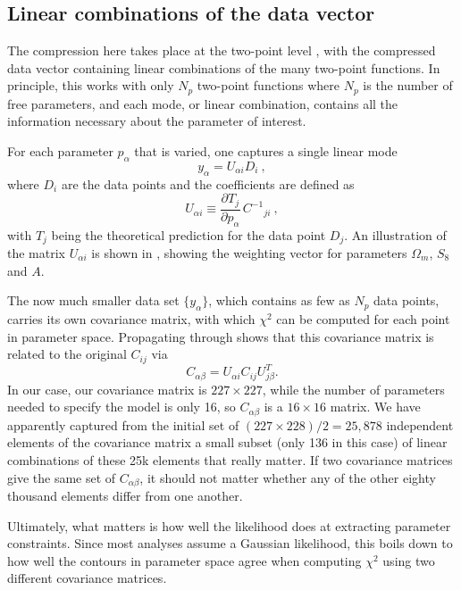 \documentclass[twocolumn]{\docclass}
\newcommand\be{\begin{equation}}
\newcommand\ee{\end{equation}}
\begin{document}
	\subsection{Linear combinations of the data vector}
	\label{subsec:2pt_compression}
	
	
	The compression here  takes place at the two-point level \citep{Zablocki:2015zcm}, with the compressed data vector containing linear combinations of the many two-point functions. In principle, this works with only $N_p$ two-point functions where $N_p$ is the number of free parameters, and each mode, or linear combination, contains all the information necessary about the parameter of interest. 
	
	For each parameter $p_\alpha$ that is varied, one captures a single linear mode
	\be
	y_\alpha = U_{\alpha i} D_i\
	,\ee
	where $D_i$ are the data points and the coefficients are defined as
	\be \label{eq:compression_scheme}
	U_{\alpha i} \equiv \frac{\partial T_j}{\partial p_\alpha} \, C^{-1}{}_{ji}\
	,\ee
	with $T_j$ being the theoretical prediction for the data point $D_j$. An illustration of the matrix $U_{\alpha i}$ is shown in , showing the weighting vector for parameters $\Omega_m$, $S_8$ and $A$.
	
	The now much smaller data set $\{y_\alpha\}$, which contains as few as $N_p$ data points, carries its own covariance matrix, with which $\chi^2$ can be computed for each point in parameter space. Propagating through shows that this covariance matrix is related to the original $C_{ij}$ via
	\be
	C_{\alpha\beta} = U_{\alpha i} C_{ij} U^T_{j\beta}.
	\ee
	In our case, our covariance matrix is  $227 \times 227$, while the number of parameters needed to specify the model is only 16, so $C_{\alpha\beta}$ is a $16\times 16$ matrix. We have apparently captured from the initial set of $(227 \times 228)/2 = 25,878$ independent elements of the covariance matrix a small subset (only 136 in this case) of linear combinations of these 25k elements that really matter. If two covariance matrices give the same set of $C_{\alpha\beta}$, it should not matter whether any of the other eighty thousand elements differ from one another.
	
	Ultimately, what matters is how well the likelihood does at extracting parameter constraints. Since most analyses assume a Gaussian likelihood, this boils down to how well the contours in parameter space agree when computing $\chi^2$ using two different covariance matrices.	
	
	
\end{document}
